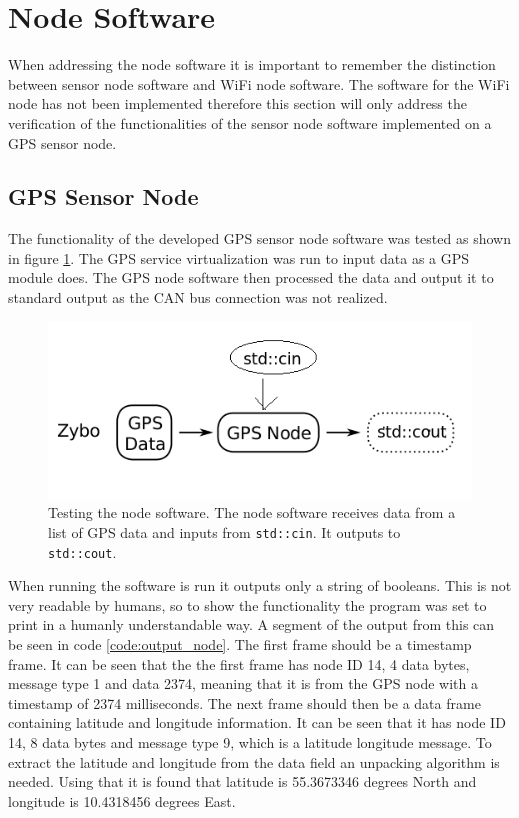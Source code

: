 \section{Node Software}
\label{sec:node_software}
When addressing the node software it is important to remember the distinction between sensor node software and WiFi node software.
The software for the WiFi node has not been implemented therefore this section will only address the verification of the functionalities of the sensor node software implemented on a GPS sensor node.

\subsection{GPS Sensor Node}
The functionality of the developed GPS sensor node software was tested as shown in figure \ref{fig:sensor_gps_veri}.
The GPS service virtualization was run to input data as a GPS module does. 
The GPS node software then processed the data and output it to standard output as the CAN bus connection was not realized.

\begin{figure}[h]
	\centering
	\includegraphics[width = 0.6\linewidth]{graphics/sensor_gps_veri}
	\caption[Testing node software.]{Testing the node software. The node software receives data from a list of GPS data and inputs from \texttt{std::cin}. It outputs to \texttt{std::cout}.}
	\label{fig:sensor_gps_veri}
\end{figure}

When running the software is run it outputs only a string of booleans. 
This is not very readable by humans, so to show the functionality the program was set to print in a humanly understandable way.
A segment of the output from this can be seen in code \ref{code:output_node}.
The first frame should be a timestamp frame.
It can be seen that the the first frame has node ID 14, 4 data bytes, message type 1 and data 2374, meaning that it is from the GPS node with a timestamp of 2374 milliseconds.
The next frame should then be a data frame containing latitude and longitude information.
It can be seen that it has node ID 14, 8 data bytes and message type 9, which is a latitude longitude message.
To extract the latitude and longitude from the data field an unpacking algorithm is needed.
Using that it is found that latitude is 55.3673346 degrees North and longitude is 10.4318456 degrees East.


